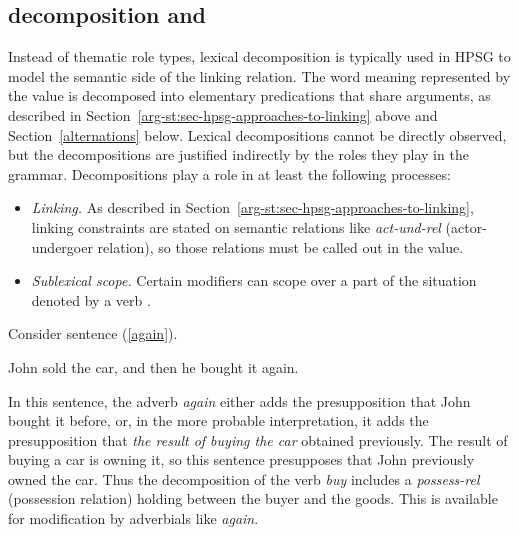 \documentclass[output=paper
 	        ,biblatex
                ,babelshorthands
                ,newtxmath
                ,draftmode
                ,colorlinks, citecolor=brown
]{langscibook}
\begin{document}
\subsection{\content decomposition and \argst}

%
%
%
%
%
Instead of thematic role types, lexical decomposition is typically used in HPSG to model the
semantic side of the linking relation.  The word meaning represented by the \content value is
decomposed into elementary predications that share arguments, as described in
Section~\ref{arg-st:sec-hpsg-approaches-to-linking} above and Section~\ref{alternations} below.
Lexical decompositions cannot be directly observed, but the decompositions are justified indirectly
by the roles they play in the grammar.  Decompositions play a role in at least the following
processes:

\begin{itemize}
\item  \textit{Linking.}  As described in Section~\ref{arg-st:sec-hpsg-approaches-to-linking}, linking constraints are stated on semantic relations like \textit{act-und-rel} (actor-undergoer relation), so those relations must be called out in the \content value.
\item \textit{Sublexical scope.}  Certain modifiers can scope over a part of the situation denoted by a verb \citep{Dowty:1979a}.  
\end{itemize}

\noindent
Consider sentence (\ref{again}).

\begin{exe}
\ex \label{again} John sold the car, and then he bought it again.
\end{exe}

\noindent
In this sentence, the adverb \textit{again} either adds the presupposition that John bought it before, or, in the more probable interpretation, it adds the presupposition that \textit{the result of buying the car} obtained previously.  The result of buying a car is owning it, so this sentence presupposes that John previously owned the car. Thus the decomposition of the verb \textit{buy} includes a \textit{possess-rel} (possession relation) holding between the buyer and the goods.  This is available for modification by adverbials like \textit{again}.
\end{document}

